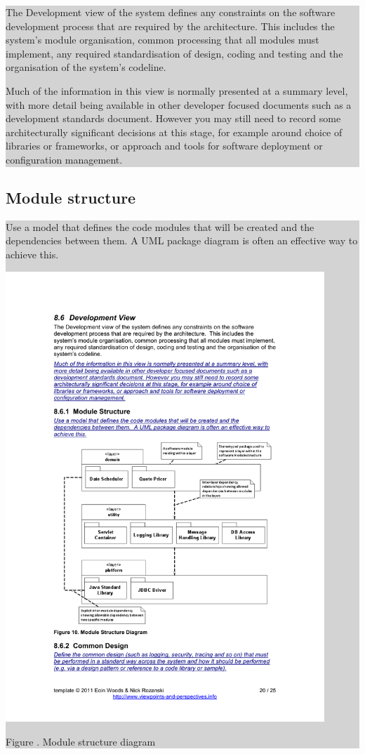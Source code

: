 \documentclass[a4paper,11pt]{report}
\newcommand{\instructions}[1]{
  \noindent\colorbox{lightgray}{%
    \parbox{\linewidth}{%
      #1
    }%
  }%
 \vspace{0.1cm}
}
\newcommand{\mycaption}[1]{
  \addtocounter{figures}{1}
  Figure \arabic{figures}. #1
}
\begin{document}
\instructions{
The Development view of the system defines any constraints on the
software development process that are required by the
architecture. This includes the system’s module organisation, common
processing that all modules must implement, any required
standardisation of design, coding and testing and the organisation of
the system’s codeline.

Much of the information in this view is normally presented at a
summary level, with more detail being available in other developer
focused documents such as a development standards document. However
you may still need to record some architecturally significant
decisions at this stage, for example around choice of libraries or
frameworks, or approach and tools for software deployment or
configuration management.
}

\subsection{Module structure}
\label{sec:module-structure}

\instructions{
Use a model that defines the code modules that will be created and the
dependencies between them. A UML package diagram is often an effective
way to achieve this.

\begin{center}
  \includegraphics[width=0.9\textwidth]{figures/modulestructurediagram}\\
  \mycaption{Module structure diagram}
\end{center}

}
\end{document}
